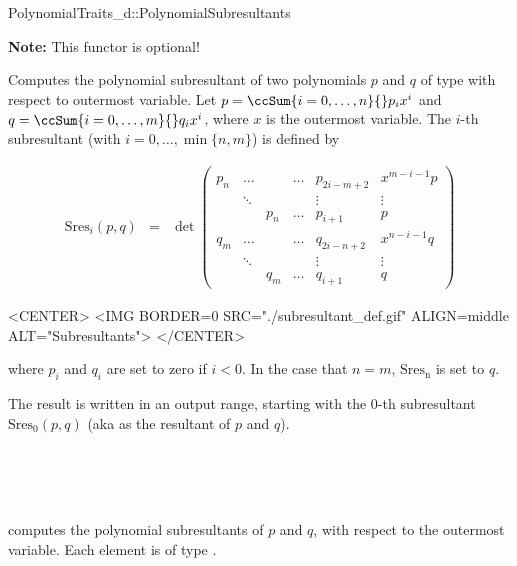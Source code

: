 \begin{ccRefConcept}{PolynomialTraits_d::PolynomialSubresultants}

\textbf{Note:} This functor is optional!

\ccDefinition

Computes the polynomial subresultant of two polynomials $p$ and $q$ of 
type  with respect to outermost variable.
Let 
$p=\ccSum{i=0,\ldots,n}{} p_i x^i$ and 
$q=\ccSum{i=0,\ldots,m}{} q_i x^i$, where $x$
is the outermost variable.
The $i$-th subresultant (with $i=0,\ldots,\min\{n,m\}$) is defined by

\begin{ccTexOnly}
\begin{eqnarray*}
\mathrm{Sres}_i(p,q)&=&\det \left(\begin{array}{ccccccc}
p_n & \ldots &&\ldots& p_{2i-m+2}&x^{m-i-1}p \\
&\ddots&&&\vdots&\vdots\\
&&p_n&\ldots&p_{i+1}&p\\
q_m & \ldots &&\ldots & q_{2i-n+2}&x^{n-i-1}q \\
&\ddots&&&\vdots&\vdots\\
&&q_m&\ldots&q_{i+1}&q
\end{array}\right)
\end{eqnarray*}
\end{ccTexOnly}

\begin{ccHtmlOnly}
<CENTER>
<IMG BORDER=0 SRC="./subresultant_def.gif" ALIGN=middle ALT="Subresultants">
</CENTER>
\end{ccHtmlOnly}

where $p_i$ and $q_i$ are set to zero if $i<0$.
In the case that $n=m$, $\mathrm{Sres_n}$ is set to $q$.

The result is written in an output range, starting with the $0$-th subresultant
$\mathrm{Sres}_0(p,q)$
(aka as the resultant of $p$ and $q$).


\ccRefines 
{}\\
\\
\\


\ccOperations
{}
         { computes the polynomial subresultants of $p$ and $q$, 
           with respect to the outermost variable. Each element is of type
           .}


\end{ccRefConcept}

